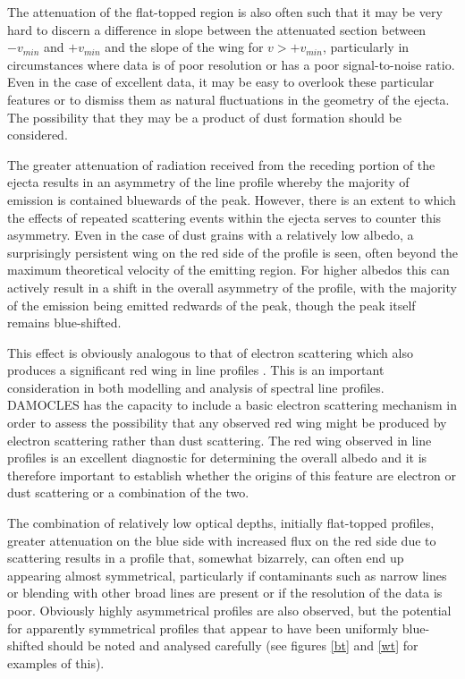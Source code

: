 \documentclass[useAMS,usenatbib,usegraphicx]{mnras}
\begin{document}
The attenuation of the flat-topped region is also often such that it may 
be very hard to discern a difference in slope between the attenuated 
section between $-v_{min}$ and $+v_{min}$ and the slope of the wing for 
$v>+v_{min}$, particularly in circumstances where data is of poor 
resolution or has a poor signal-to-noise ratio.  Even in the case of 
excellent data, it may be easy to overlook these particular features or to 
dismiss them as natural fluctuations in the geometry of the ejecta.  The 
possibility that they may be a product of dust formation should be 
considered.

The greater attenuation of radiation received from the receding portion of 
the ejecta results in an asymmetry of the line profile whereby the 
majority of emission is contained bluewards of the peak.  However, there 
is an extent to which the effects of repeated scattering events within the 
ejecta serves to counter this asymmetry.  Even in the case of dust grains 
with a relatively low albedo, a surprisingly persistent wing on the red 
side of the profile is seen, often beyond the maximum theoretical velocity 
of the emitting region.  For higher albedos this can actively result in a 
shift in the overall asymmetry of the profile, with the majority of the 
emission being emitted redwards of the peak, though the peak itself 
remains blue-shifted.

This effect is obviously analogous to that of electron scattering which 
also produces a significant red wing in line profiles \citep{Hillier1991, 
Auer1972b}. This is an important consideration in both modelling and 
analysis of spectral line profiles.  DAMOCLES has the capacity to include 
a basic electron scattering mechanism in order to assess the possibility 
that any observed red wing might be produced by electron scattering rather 
than dust scattering.  The red wing observed in line profiles is an 
excellent diagnostic for determining the overall albedo and it is 
therefore important to establish whether the origins of this feature are 
electron or dust scattering or a combination of the two.

The combination of relatively low optical depths, initially flat-topped 
profiles, greater attenuation on the blue side with increased flux on the 
red side due to scattering results in a profile that, somewhat bizarrely, 
can often end up appearing almost symmetrical, particularly if 
contaminants such as narrow lines or blending with other broad lines are 
present or if the resolution of the data is poor.  Obviously highly 
asymmetrical profiles are also observed, but the potential for apparently 
symmetrical profiles that appear to have been uniformly blue-shifted 
should be noted and analysed carefully (see figures \ref{bt} and \ref{wt} 
for examples of this).
\end{document}
